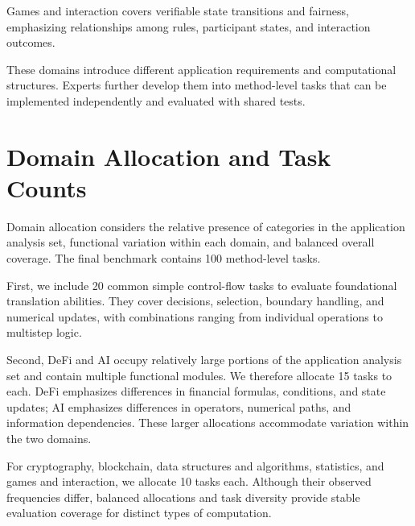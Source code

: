 \documentclass[11pt,a4paper]{article}
\begin{document}
Games and interaction covers verifiable state transitions and fairness, emphasizing relationships among rules, participant states, and interaction outcomes.

These domains introduce different application requirements and computational structures. Experts further develop them into method-level tasks that can be implemented independently and evaluated with shared tests.

\section{Domain Allocation and Task Counts}

Domain allocation considers the relative presence of categories in the application analysis set, functional variation within each domain, and balanced overall coverage. The final benchmark contains 100 method-level tasks.

First, we include 20 common simple control-flow tasks to evaluate foundational translation abilities. They cover decisions, selection, boundary handling, and numerical updates, with combinations ranging from individual operations to multistep logic.

Second, DeFi and AI occupy relatively large portions of the application analysis set and contain multiple functional modules. We therefore allocate 15 tasks to each. DeFi emphasizes differences in financial formulas, conditions, and state updates; AI emphasizes differences in operators, numerical paths, and information dependencies. These larger allocations accommodate variation within the two domains.

For cryptography, blockchain, data structures and algorithms, statistics, and games and interaction, we allocate 10 tasks each. Although their observed frequencies differ, balanced allocations and task diversity provide stable evaluation coverage for distinct types of computation.
\end{document}
